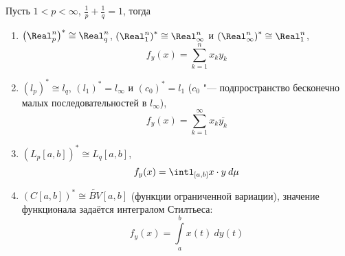 \documentclass[main]{subfiles}
\begin{document}
\begin{exercise}
  Пусть \( 1 < p < \infty \), \( \frac{1}{p} + \frac{1}{q} = 1 \), тогда
  \begin{enumerate}
    \item \( {\left(\Real^n_p\right)}^* \cong \Real^n_q \),
      \( {\left(\Real^n_1\right)}^* \cong \Real^n_\infty \) и
      \( {\left(\Real^n_\infty\right)}^* \cong \Real^n_1 \),
      \[
	f_y(x) = \sum_{k=1}^n x_k y_k
      \]
    \item \( {(l_p)}^* \cong l_q \),
      \( {(l_1)}^* = l_\infty \) и \( {(c_0)}^* = l_1 \)
      (\( c_0 \) "--- подпространство бесконечно малых
      последовательностей в \( l_\infty \)),
      \[
	f_y(x) = \sum_{k = 1}^\infty x_k \overline{y_k}
      \]
    \item \( {\left( L_p[a, b] \right)}^* \cong L_q[a, b] \),
      \[
	f_y(x) = \intl_{[a,b]} x \cdot y \: d\mu
      \]
    \item \( {\left( C[a,b] \right)}^* \cong \widetilde{BV}[a,b] \)
      (функции ограниченной вариации),
      значение функционала задаётся интегралом Стилтьеса:
      \[
        f_y(x) = \int\limits_a^b x(t) \: dy(t)
      \]
  \end{enumerate}
\end{exercise}
\end{document}
